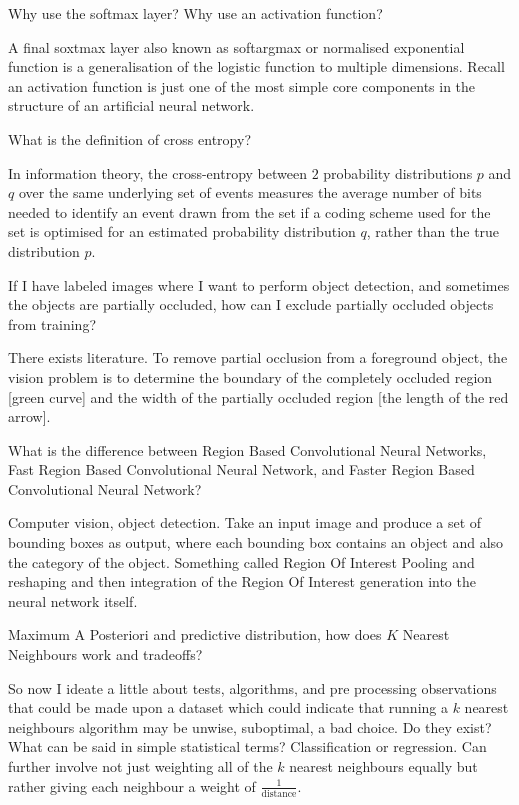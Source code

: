 Why use the softmax layer? Why use an activation function?

A final soxtmax layer also known as softargmax or normalised exponential function is a generalisation of the logistic function to multiple dimensions. Recall an activation function is just one of the most simple core components in the structure of an artificial neural network.

What is the definition of cross entropy?

In information theory, the cross-entropy between $2$ probability distributions $p$ and $q$ over the same underlying set of events measures the average number of bits needed to identify an event drawn from the set if a coding scheme used for the set is optimised for an estimated probability distribution $q$, rather than the true distribution $p$.

If I have labeled images where I want to perform object detection, and sometimes the objects are partially occluded, how can I exclude partially occluded objects from training?

There exists literature. To remove partial occlusion from a foreground object, the vision problem is to determine the boundary of the completely occluded region [green curve] and the width of the partially occluded region [the length of the red arrow].

What is the difference between Region Based Convolutional Neural Networks, Fast Region Based Convolutional Neural Network, and Faster Region Based Convolutional Neural Network?

Computer vision, object detection. Take an input image and produce a set of bounding boxes as output, where each bounding box contains an object and also the category of the object. Something called Region Of Interest Pooling and reshaping and then integration of the Region Of Interest generation into the neural network itself.

Maximum A Posteriori and predictive distribution, how does $K$ Nearest Neighbours work and tradeoffs?

So now I ideate a little about tests, algorithms, and pre processing observations that could be made upon a dataset which could indicate that running a $k$ nearest neighbours algorithm may be unwise, suboptimal, a bad choice. Do they exist? What can be said in simple statistical terms? Classification or regression. Can further involve not just weighting all of the $k$ nearest neighbours equally but rather giving each neighbour a weight of $\frac{1}{\text{distance}}$.

